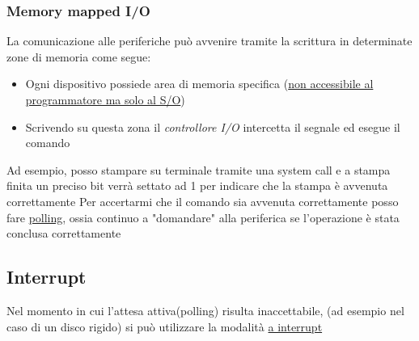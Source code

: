 \subsubsection*{Memory mapped I/O}
La comunicazione alle periferiche può avvenire tramite la scrittura in determinate zone di memoria come segue:
\begin{itemize}
	\item Ogni dispositivo possiede area di memoria specifica (\underline{non accessibile al programmatore ma solo al S/O})
	\item Scrivendo su questa zona il \textit{controllore I/O} intercetta il segnale ed esegue il comando
\end{itemize}
Ad esempio, posso stampare su terminale tramite una system call e a stampa finita un preciso bit verrà settato ad 1 per indicare che la stampa è avvenuta correttamente
\vskip3mm
Per accertarmi che il comando sia avvenuta correttamente posso fare \underline{polling}, ossia continuo a "domandare" alla periferica se l'operazione è stata conclusa correttamente
\subsection{Interrupt}
Nel momento in cui l'attesa attiva(polling) risulta inaccettabile, (ad esempio nel caso di un disco rigido) si può utilizzare la modalità \underline{a interrupt}
